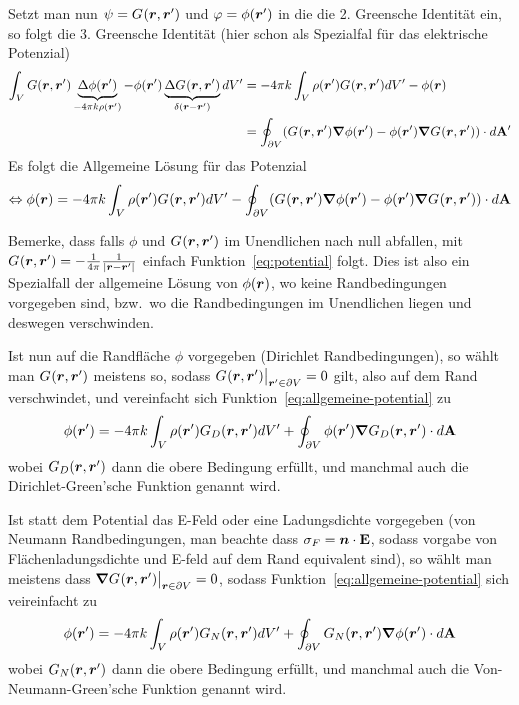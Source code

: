 Setzt man nun $\psi=\green$ und $\varphi=\phi(\vr')$ in die die 2.
Greensche Identität ein, so folgt die 3. Greensche Identität (hier schon
als Spezialfal für das elektrische Potenzial)
\begin{equation}
  \begin{split}
    \int_V G(\vb*r,\vb*r')\underbrace{\Delta\phi(\vb*r')}_{%
    -4\pi k\rho(\vb*r')} 
    - \phi(\vb*r')\underbrace{\Delta \green}_{\delta(\vb*r - \vb*r')}
    dV'
    &= -4\pi k\int_V \rho(\vb*r') \green dV' -\phi(\vb*r)\\
    &= \oint_{\partial V} (\green\grad\phi(\vr')-\phi(\vr')\grad\green)\ddA'\\
  \end{split}
\end{equation}
Es folgt die Allgemeine Lösung für das Potenzial
\begin{equation}
  \label{eq:allgemeine-potential}
  \Leftrightarrow \phi(\vr) = -4\pi k\int_V \rho(\vr')\green dV' 
  - \oint_{\partial V} (\green\grad\phi(\vr')-\phi(\vr')\grad\green)\ddA
\end{equation}

Bemerke, dass falls $\phi$ und $\green$ im Unendlichen nach null abfallen,
mit $\green=-\frac{1}{4\pi} \frr $ einfach Funktion~\ref{eq:potential} folgt.
Dies ist also ein Spezialfall der allgemeine Lösung von $\phi(\vr)$, wo
keine Randbedingungen vorgegeben sind, bzw.\ wo die Randbedingungen im
Unendlichen liegen und deswegen verschwinden.

Ist nun auf die Randfläche $\phi$ vorgegeben (Dirichlet Randbedingungen), 
so wählt man $\green$ meistens so,
sodass $\green\big|_{\vr'\in\partial V}= 0$ gilt, also auf dem Rand 
verschwindet, und vereinfacht sich Funktion~\ref{eq:allgemeine-potential} zu
\begin{equation}
  \label{eq:dirichlet-green-potential}
  \phi(\vb*r') = -4\pi k\int_V \rho(\vr')\green[D] dV' 
  + \oint_{\partial V} \phi(\vr')\grad\green[D] \ddA
\end{equation}
wobei $\green[D]$ dann die obere Bedingung erfüllt, und manchmal
auch die Dirichlet-Green'sche Funktion genannt wird.

Ist statt dem Potential das E-Feld oder eine Ladungsdichte vorgegeben 
(von Neumann Randbedingungen, man beachte dass $\sigma_F=\vb*n\cdot\vb E$,
sodass vorgabe von Flächenladungsdichte und E-feld auf dem Rand equivalent 
sind), so wählt man meistens dass $\grad\green\big|_{\vr\in\partial V}=0$,
sodass Funktion~\ref{eq:allgemeine-potential} sich veireinfacht zu
\begin{equation}
  \phi(\vb*r') = -4\pi k\int_V \rho(\vr')\green[N] dV' 
  + \oint_{\partial V} \green[N]\grad\phi(\vr') \ddA
\end{equation}
wobei $\green[N]$ dann die obere Bedingung erfüllt, und manchmal
auch die Von-Neumann-Green'sche Funktion genannt wird.

